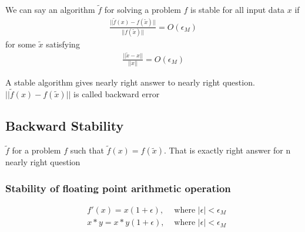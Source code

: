 \documentclass{article}
\begin{document}
We can say an algorithm $\tilde{f}$ for solving a problem $f$ is stable for all input data $x$ if
\begin{align*}
\frac{||\tilde{f}(x) - f(\tilde{x})||}{||f(\tilde{x})||} = O(\epsilon_M)
\end{align*}
for some $\tilde{x}$ satisfying
\begin{align*}
\frac{||\tilde{x} - x||}{||x||} = O(\epsilon_M)
\end{align*}

A stable algorithm gives nearly right answer to nearly right question. $||\tilde{f}(x) - f(\tilde{x})||$ is called backward error

\subsection{Backward Stability}
\label{sec:backward-stability}

$\tilde{f}$ for a problem $f$ such that $\boxed{\tilde{f}(x) = f(\tilde{x})}$. That is exactly right answer for n nearly right question

\subsubsection{Stability of floating point arithmetic operation}
\label{sec:stab-float-point}

\begin{align*}
  & f'(x) = x(1 + \epsilon),     &\text{ where } |\epsilon| < \epsilon_M\\
  & x * y = x * y(1 + \epsilon), &\text{ where } |\epsilon| < \epsilon_M\\
\end{align*}
\end{document}
